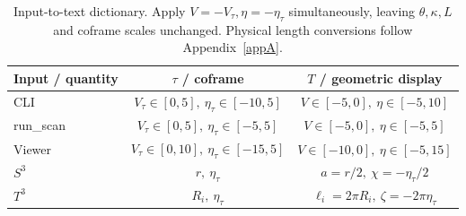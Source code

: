 \begin{table}[htbp]
\centering
\small
\caption{Input-to-text dictionary. Apply $V=-V_\tau,\eta=-\eta_\tau$ simultaneously, leaving $\theta,\kappa,L$ and coframe scales unchanged. Physical length conversions follow Appendix~\ref{appA}.}\label{tab:v3:6}
\setlength{\tabcolsep}{4pt}
\renewcommand{\arraystretch}{1.25}
\begin{tabular}{lcc}
\toprule
Input / quantity & $\tau$ / coframe & $T$ / geometric display \\
\midrule
CLI & $V_\tau\in[0,5],\ \eta_\tau\in[-10,5]$ & $V\in[-5,0],\ \eta\in[-5,10]$ \\
run\_scan & $V_\tau\in[0,5],\ \eta_\tau\in[-5,5]$ & $V\in[-5,0],\ \eta\in[-5,5]$ \\
Viewer & $V_\tau\in[0,10],\ \eta_\tau\in[-15,5]$ & $V\in[-10,0],\ \eta\in[-5,15]$ \\
$S^3$ & $r,\ \eta_\tau$ & $a=r/2,\ \chi=-\eta_\tau/2$ \\
$T^3$ & $R_i,\ \eta_\tau$ & $\ell_i=2\pi R_i,\ \zeta=-2\pi\eta_\tau$ \\
\bottomrule
\end{tabular}
\end{table}
